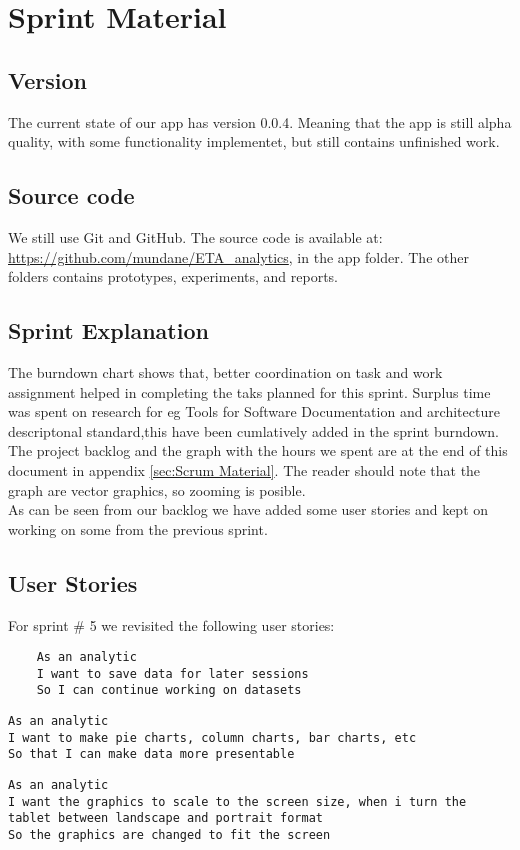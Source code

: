 \section{Sprint Material} %
\label{sec:Sprint Material}
\subsection{Version} %
\label{sub:Version}
The current state of our app has version 0.0.4. Meaning that the app is still alpha quality, with some functionality implementet, but still contains unfinished work.
\subsection{Source code} %
\label{sub:Source code}
We still use Git and GitHub. The source code is available at: \url{https://github.com/mundane/ETA_analytics}, in the app folder. The other folders contains prototypes, experiments, and reports.
\subsection{Sprint Explanation}
The burndown chart shows that, better coordination on task and work assignment helped in completing the taks planned for this sprint.
Surplus time was spent on research for eg Tools for Software Documentation and architecture descriptonal standard,this have been cumlatively added in the sprint burndown.
The project backlog and the graph with the hours we spent are at the end of this document in appendix \ref{sec:Scrum Material}. The reader should note that the graph are vector graphics, so zooming is posible. \\
As can be seen from our backlog we have added some user stories and kept on working on some from the previous sprint.
\subsection{User Stories}
For sprint \# 5 we revisited the following user stories: \\
\begin{verbatim}
	As an analytic
	I want to save data for later sessions
	So I can continue working on datasets
\end{verbatim}
\begin{verbatim}
As an analytic
I want to make pie charts, column charts, bar charts, etc
So that I can make data more presentable
\end{verbatim}
\begin{verbatim}
As an analytic
I want the graphics to scale to the screen size, when i turn the tablet between landscape and portrait format
So the graphics are changed to fit the screen
\end{verbatim}
